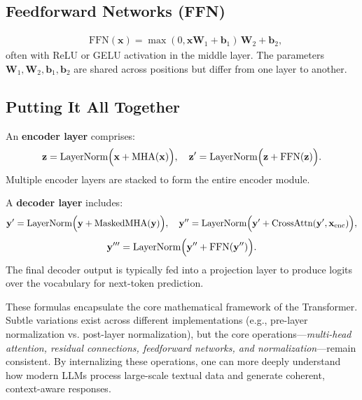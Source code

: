 \subsection{Feedforward Networks (FFN)}
\begin{align*}
&\text{FFN}(\mathbf{x}) = \max(0, \mathbf{x}\mathbf{W}_1 + \mathbf{b}_1)\,\mathbf{W}_2 + \mathbf{b}_2,
\end{align*}
often with ReLU or GELU activation in the middle layer. The parameters $\mathbf{W}_1, \mathbf{W}_2, \mathbf{b}_1, \mathbf{b}_2$ are shared across positions but differ from one layer to another.

\subsection{Putting It All Together}
\noindent
An \textbf{encoder layer} comprises:
\[
\mathbf{z} = \text{LayerNorm}\Bigl(\mathbf{x} + \text{MHA}(\mathbf{x})\Bigr), \quad
\mathbf{z}' = \text{LayerNorm}\Bigl(\mathbf{z} + \text{FFN}(\mathbf{z})\Bigr).
\]
Multiple encoder layers are stacked to form the entire encoder module.

\noindent
A \textbf{decoder layer} includes:
\[
\mathbf{y}' = \text{LayerNorm}\Bigl(\mathbf{y} + \text{MaskedMHA}(\mathbf{y})\Bigr),\quad
\mathbf{y}'' = \text{LayerNorm}\Bigl(\mathbf{y}' + \text{CrossAttn}(\mathbf{y}', \mathbf{x}_{\text{enc}})\Bigr),
\]
\[
\mathbf{y}''' = \text{LayerNorm}\Bigl(\mathbf{y}'' + \text{FFN}(\mathbf{y}'')\Bigr).
\]
The final decoder output is typically fed into a projection layer to produce logits over the vocabulary for next-token prediction.

\noindent
These formulas encapsulate the core mathematical framework of the Transformer. Subtle variations exist across different implementations (e.g., pre-layer normalization vs. post-layer normalization), but the core operations—\emph{multi-head attention, residual connections, feedforward networks, and normalization}—remain consistent. By internalizing these operations, one can more deeply understand how modern LLMs process large-scale textual data and generate coherent, context-aware responses.
